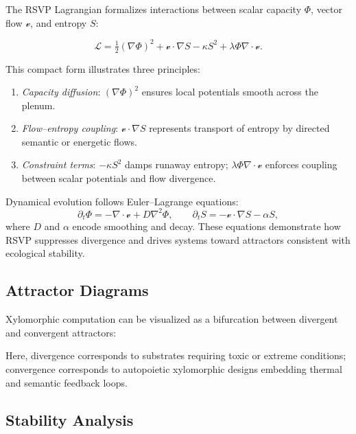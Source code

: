 \documentclass[12pt]{article}
\begin{document}
The RSVP Lagrangian formalizes interactions between scalar capacity $\Phi$, vector flow $\mathcal{v}$, and entropy $S$:

\[
\mathcal{L} = \tfrac{1}{2} (\nabla \Phi)^2 + \mathcal{v} \cdot \nabla S - \kappa S^2 + \lambda \Phi \nabla \cdot \mathcal{v}.
\]

This compact form illustrates three principles:
\begin{enumerate}
    \item \emph{Capacity diffusion}: $(\nabla \Phi)^2$ ensures local potentials smooth across the plenum.
    \item \emph{Flow–entropy coupling}: $\mathcal{v} \cdot \nabla S$ represents transport of entropy by directed semantic or energetic flows.
    \item \emph{Constraint terms}: $-\kappa S^2$ damps runaway entropy; $\lambda \Phi \nabla \cdot \mathcal{v}$ enforces coupling between scalar potentials and flow divergence.
\end{enumerate}

Dynamical evolution follows Euler–Lagrange equations:
\[
\partial_t \Phi = - \nabla \cdot \mathcal{v} + D \nabla^2 \Phi, \qquad
\partial_t S = - \mathcal{v}\cdot \nabla S - \alpha S,
\]
where $D$ and $\alpha$ encode smoothing and decay. These equations demonstrate how RSVP suppresses divergence and drives systems toward attractors consistent with ecological stability.

\subsection{Attractor Diagrams}

Xylomorphic computation can be visualized as a bifurcation between divergent and convergent attractors:


Here, divergence corresponds to substrates requiring toxic or extreme conditions; convergence corresponds to autopoietic xylomorphic designs embedding thermal and semantic feedback loops.

\subsection{Stability Analysis}
\end{document}
